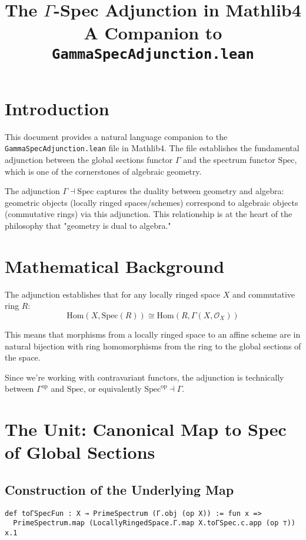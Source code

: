 \documentclass{article}
\title{The $\Gamma$-Spec Adjunction in Mathlib4\\
\large A Companion to \texttt{GammaSpecAdjunction.lean}}
\author{}
\date{}
\theoremstyle{definition}
\begin{document}
\maketitle

\section{Introduction}

This document provides a natural language companion to the \texttt{GammaSpecAdjunction.lean} file in Mathlib4. The file establishes the fundamental adjunction between the global sections functor $\Gamma$ and the spectrum functor $\mathrm{Spec}$, which is one of the cornerstones of algebraic geometry.

The adjunction $\Gamma \dashv \mathrm{Spec}$ captures the duality between geometry and algebra: geometric objects (locally ringed spaces/schemes) correspond to algebraic objects (commutative rings) via this adjunction. This relationship is at the heart of the philosophy that "geometry is dual to algebra."

\section{Mathematical Background}

The adjunction establishes that for any locally ringed space $X$ and commutative ring $R$:
$$\text{Hom}(X, \mathrm{Spec}(R)) \cong \text{Hom}(R, \Gamma(X, \mathcal{O}_X))$$

This means that morphisms from a locally ringed space to an affine scheme are in natural bijection with ring homomorphisms from the ring to the global sections of the space.

Since we're working with contravariant functors, the adjunction is technically between $\Gamma^{\text{op}}$ and $\mathrm{Spec}$, or equivalently $\mathrm{Spec}^{\text{op}} \dashv \Gamma$.

\section{The Unit: Canonical Map to Spec of Global Sections}

\subsection{Construction of the Underlying Map}

\begin{lstlisting}
def toΓSpecFun : X → PrimeSpectrum (Γ.obj (op X)) := fun x =>
  PrimeSpectrum.map (LocallyRingedSpace.Γ.map X.toΓSpec.c.app (op ⊤)) x.1
\end{lstlisting}
\end{document}
